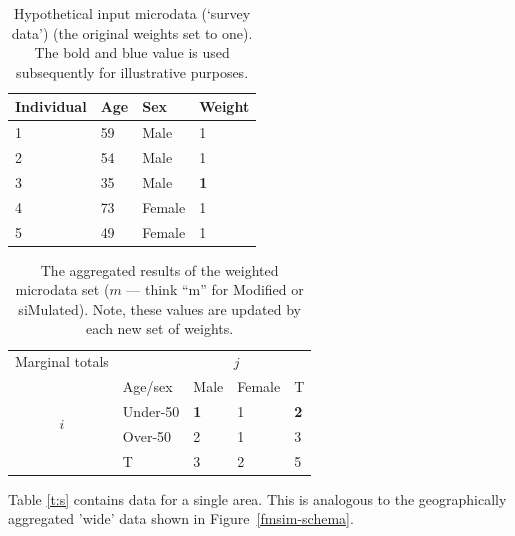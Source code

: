 \documentclass[a4paper, 11pt, twoside]{article}
\begin{document}
\begin{table}[h]
\caption{Hypothetical input microdata (`survey data')
(the original
weights set to one). The bold and blue value is used subsequently for
illustrative purposes.
}
\label{t:w}
\begin{center}
 \begin{tabular}{llll}
\toprule
{Individual } & {Age} & {Sex}  & {Weight} \\
\midrule
1 & 59 & Male  & 1 \\
2 & 54 & Male & 1 \\
3 & {35} & {Male} & \textbf{\color{blue}1} \\
4 & 73 & Female & 1 \\
5 & 49 & Female & 1 \\
\bottomrule
\end{tabular}
\end{center}
\end{table}

\begin{table}[htbp]
\centering
\caption[The aggregated results of the weighted
microdata set]{The aggregated results of the weighted
microdata set ($m$ --- think ``m'' for Modified or siMulated).
Note, these values are updated by each new set of weights.
}

\begin{tabular}{cllll}\toprule
Marginal totals&  & \multicolumn{2}{c}{$j$} & \\
& Age/sex & Male & Female & T \\ \midrule
\multirow{2}{*}{$i$} & Under-50 & \textbf{\color{blue}1} & 1 & \textbf{\color{blue}2}\\
& Over-50 & 2 & 1 &3 \\
& T & 3 & 2 &5\\
\bottomrule
\end{tabular}
\label{t:m}
\end{table}

Table \ref{t:s} contains data for a single area. This is analogous to the
geographically aggregated 'wide' data shown in Figure~\ref{fmsim-schema}.
\end{document}
